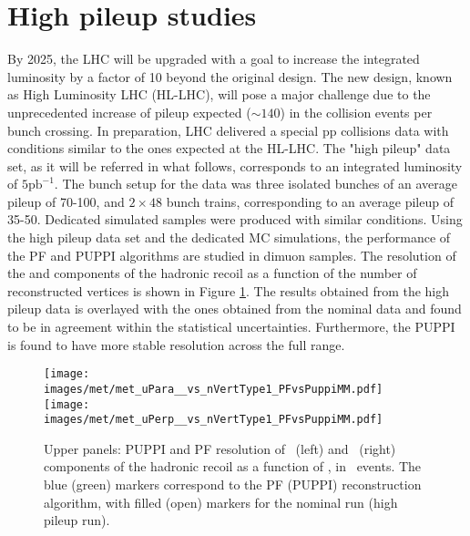 \section{High pileup studies}
\noindent\justify
By 2025, the LHC will be upgraded with a goal to increase the integrated luminosity by a factor of 10 beyond the original design. 
The new design, known as High Luminosity LHC (HL-LHC), will pose a major challenge due to the unprecedented increase of pileup expected ($\sim140$) in the collision events per bunch crossing. 
In preparation, LHC delivered a special pp collisions data with conditions similar to the ones expected at the HL-LHC. 
The "high pileup" data set, as it will be referred in what follows, corresponds to an integrated luminosity of $5\mathrm{pb}^{-1}$. 
The bunch setup for the data was three isolated bunches of an average pileup of 70-100, and $2\times48$ bunch trains, corresponding to an average pileup of 35-50. 
Dedicated simulated samples were produced with similar conditions. 
\newpara
\noindent\justify
Using the high pileup data set and the dedicated MC simulations, the performance of the PF \ptmiss and PUPPI \ptmiss algorithms are studied in dimuon samples.
The \ptmiss resolution of the \upar and \uperp components of the hadronic recoil as a function of the number of reconstructed
vertices is shown in Figure \ref{fig:Res_vs_PileUpVeryHighPU}. 
The results obtained from the high pileup data is overlayed with the ones obtained from the nominal data and found to be in agreement within the statistical uncertainties. 
Furthermore, the PUPPI \ptmiss is found to have more stable resolution across the full range.
\begin{figure}[!htp]
  \centering
   \texttt{[image: images/met/met\_uPara\_\_vs\_nVertType1\_PFvsPuppiMM.pdf]}
   \texttt{[image: images/met/met\_uPerp\_\_vs\_nVertType1\_PFvsPuppiMM.pdf]}
   \caption{Upper panels: PUPPI and PF \ptmiss resolution of \upar\ (left) and \uperp\ (right) components of the hadronic recoil as a function of \nvtx, in \Zmm\ events. 
The blue (green) markers correspond to the PF (PUPPI) \ptmiss reconstruction algorithm, with filled (open) markers for the nominal run (high pileup run). } 
   \label{fig:Res_vs_PileUpVeryHighPU}
\end{figure}                                                                                                                                                                         
